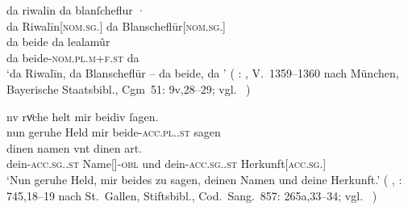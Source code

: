 \begin{exe}
\ex \label{ex:askedal73pr}
	\begin{xlist}
	\ex \label{ex:askedal73pr_1}
		\gll da riwalin da {blanſcheflur ·} \\
			da Riwalīn[\textsc{nom.sg.\MascM}] da
				Blanscheflūr[\textsc{nom.sg.\FemF}] \\
	\sn \gll da beide da lealamûr \\
			da beide-\textsc{nom.pl.m+f\subMF.st} da  \\
		\trans `da Riwalīn, da Blanscheflūr -- da beide, da '
			(%
				: , V.~1359--1360
				nach München, Bayerische Staatsbibl., Cgm~51: 9v,28--29;
				vgl.~\cite[22]{maroldschroeder1969}%
			)

	\ex \label{ex:askedal73pr_2}
		\gll nv rvͦche helt mir beidiv ſagen. \\
			nun geruhe Held mir beide-\textsc{acc.pl.\NeutI.st} sagen \\
	\sn \gll dinen namen vnt dinen art. \\
			dein-\textsc{acc.sg.\MascI.st} Name[\textsc{\MascI}]-\textsc{obl}
			und dein-\textsc{acc.sg.\MascI.st}
			Herkunft[\textsc{acc.sg.\MascI}] \\
		\trans `Nun geruhe Held, mir beides zu sagen, deinen Namen und
			deine Herkunft.'\footnotemark{}
			(%
				, : 745,18--19
				nach St.~Gallen, Stiftsbibl., Cod.~Sang.~857: 265a,33--34;
				vgl.~\cite[749]{knechtschirok2003}%
			)
	\end{xlist}
\end{exe}
%

